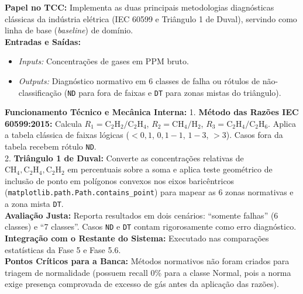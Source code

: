 \documentclass[10pt,a4paper]{article}
\begin{document}
\begin{filebox}
\textbf{Papel no TCC:} Implementa as duas principais metodologias diagnósticas clássicas da indústria elétrica (IEC 60599 e Triângulo 1 de Duval), servindo como linha de base (\textit{baseline}) de domínio.\\
\textbf{Entradas e Saídas:}
\begin{itemize}[leftmargin=*,itemsep=1pt]
  \item \textit{Inputs:} Concentrações de gases em PPM bruto.
  \item \textit{Outputs:} Diagnóstico normativo em 6 classes de falha ou rótulos de não-classificação (\texttt{ND} para fora de faixas e \texttt{DT} para zonas mistas do triângulo).
\end{itemize}
\textbf{Funcionamento Técnico e Mecânica Interna:} 
1. \textbf{Método das Razões IEC 60599:2015:} Calcula $R_1 = \text{C}_2\text{H}_2/\text{C}_2\text{H}_4$, $R_2 = \text{CH}_4/\text{H}_2$, $R_3 = \text{C}_2\text{H}_4/\text{C}_2\text{H}_6$. Aplica a tabela clássica de faixas lógicas ($<0,1$, $0,1-1$, $1-3$, $>3$). Casos fora da tabela recebem rótulo \texttt{ND}.\\
2. \textbf{Triângulo 1 de Duval:} Converte as concentrações relativas de $\text{CH}_4, \text{C}_2\text{H}_4, \text{C}_2\text{H}_2$ em percentuais sobre a soma e aplica teste geométrico de inclusão de ponto em polígonos convexos nos eixos baricêntricos (\texttt{matplotlib.path.Path.contains\_point}) para mapear as 6 zonas normativas e a zona mista \texttt{DT}.\\
\textbf{Avaliação Justa:} Reporta resultados em dois cenários: ``somente falhas'' (6 classes) e ``7 classes''. Casos \texttt{ND} e \texttt{DT} contam rigorosamente como erro diagnóstico.\\
\textbf{Integração com o Restante do Sistema:} Executado nas comparações estatísticas da Fase 5 e Fase 5.6.\\
\textbf{Pontos Críticos para a Banca:} Métodos normativos não foram criados para triagem de normalidade (possuem recall 0\% para a classe Normal, pois a norma exige presença comprovada de excesso de gás antes da aplicação das razões).
\end{filebox}
\end{document}
